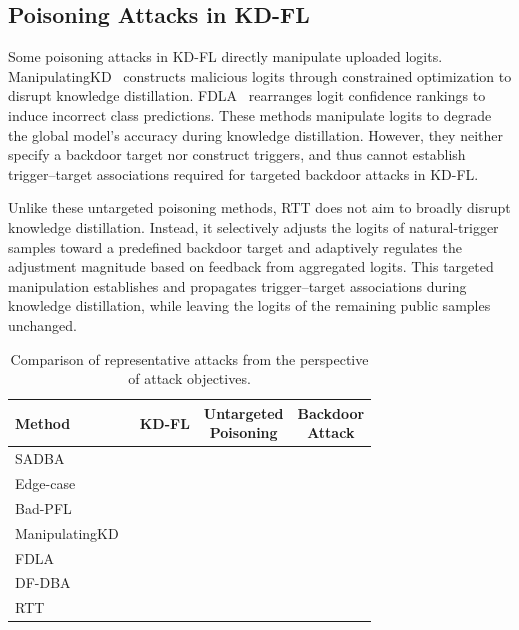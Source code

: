 \documentclass[lettersize,journal]{IEEEtran}
\newif\ifhighlight
\newcommand{\hlone}[1]{%
    \ifhighlight{\color{reviewer1}#1}\else#1\fi
}
\newcommand{\hltwo}[1]{%
    \ifhighlight{\color{reviewer2}#1}\else#1\fi
}
\newcommand{\cmark}{\ding{51}}
\newcommand{\xmark}{\ding{55}}
\begin{document}
\hlone{
\subsection{Poisoning Attacks in KD-FL}
Some poisoning attacks in KD-FL directly manipulate uploaded logits.
ManipulatingKD~\cite{ManipulatingKD} constructs malicious logits through constrained optimization to disrupt knowledge distillation.
FDLA~\cite{FDLA} rearranges logit confidence rankings to induce incorrect class predictions.
These methods manipulate logits to degrade the global model's accuracy during knowledge distillation. However, they neither specify a backdoor target nor construct triggers, and thus cannot establish trigger–target associations required for targeted backdoor attacks in KD-FL.
}
\hltwo{Unlike these untargeted poisoning methods, RTT does not aim to broadly disrupt knowledge distillation.
Instead, it selectively adjusts the logits of natural-trigger samples toward a predefined backdoor target and adaptively regulates the adjustment magnitude based on feedback from aggregated logits.
This targeted manipulation establishes and propagates trigger--target associations during knowledge distillation, while leaving the logits of the remaining public samples unchanged.}

\begin{table}[t]
\centering
\renewcommand\arraystretch{1.2}
\setlength{\tabcolsep}{5pt}
\caption{Comparison of representative attacks from the perspective of attack objectives.}
\begin{tabular}{lccc}
\toprule
Method 
& KD-FL 
& \makecell{Untargeted\\Poisoning}
& \makecell{Backdoor\\Attack} \\
\midrule
SADBA~\cite{SADBA} 
& \xmark & \xmark & \cmark \\

Edge-case~\cite{edge-case} 
& \xmark & \xmark & \cmark \\

Bad-PFL~\cite{Bad_PFL} 
& \xmark & \xmark & \cmark \\

ManipulatingKD~\cite{ManipulatingKD} 
& \cmark & \cmark & \xmark \\

FDLA~\cite{FDLA} 
& \cmark & \cmark & \xmark \\

\hlone{DF-DBA}~\cite{liu2026distributed}
& \hlone{\cmark} & \hlone{\xmark} & \hlone{\cmark} \\

\midrule
RTT 
& \cmark & \xmark & \cmark \\
\bottomrule
\end{tabular}
\label{attack_objective}
\end{table}
\end{document}
